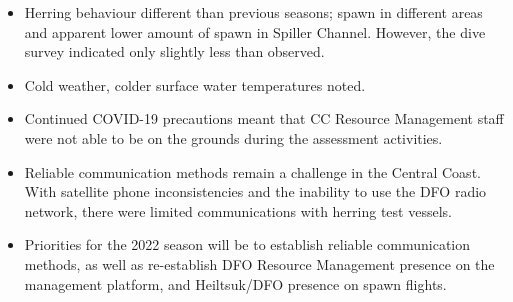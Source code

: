 \begin{itemize}
\item Herring behaviour different than previous seasons;
spawn in different areas and apparent lower amount of spawn in Spiller Channel.
However, the dive survey indicated only slightly less than observed.
\item Cold weather, colder surface water temperatures noted.
\item Continued COVID-19 precautions meant that CC Resource Management staff
were not able to be on the grounds during the assessment activities.
\item Reliable communication methods remain a challenge in the Central Coast.
With satellite phone inconsistencies and the inability to use the DFO radio network,
there were limited communications with herring test vessels.
\item Priorities for the 2022 season will be to establish reliable communication methods,
as well as re-establish DFO Resource Management presence on the management platform, 
and Heiltsuk/DFO presence on spawn flights.
\end{itemize}